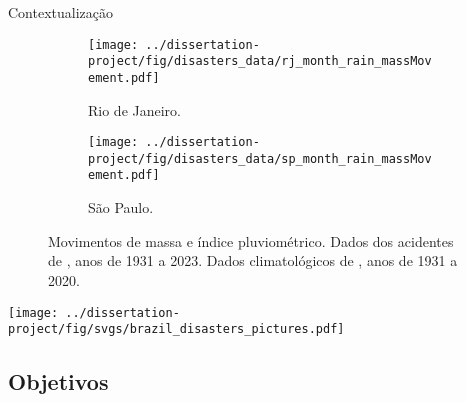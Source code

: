 \begin{frame}{Contextualização}
    \begin{figure}
        \centering
        \begin{subfigure}{0.45\textwidth}
            \centering
            \texttt{[image: ../dissertation-project/fig/disasters\_data/rj\_month\_rain\_massMovement.pdf]}
            \caption{Rio de Janeiro.}
            \label{fig:rj}
        \end{subfigure}
        \hfill
        \begin{subfigure}{0.45\textwidth}
            \centering
            \texttt{[image: ../dissertation-project/fig/disasters\_data/sp\_month\_rain\_massMovement.pdf]}
            \caption{São Paulo.}
            \label{fig:sp}
        \end{subfigure}
    
        \caption{Movimentos de massa e índice pluviométrico. Dados dos acidentes de \cite{atlas_brazil_2023}, anos de 1931 a 2023. Dados climatológicos de \cite{ANA}, anos de 1931 a 2020.}
        \label{fig:test}
    \end{figure}
\end{frame}


\begin{frame}
    \begin{minipage}[c]{0.6\textwidth}
        \centering
        \texttt{[image: ../dissertation-project/fig/svgs/brazil\_disasters\_pictures.pdf]}
    \end{minipage}
    \hfill
    \begin{minipage}[c]{0.38\textwidth}
        \centering
    \end{minipage}
\end{frame}

\subsection{Objetivos}

